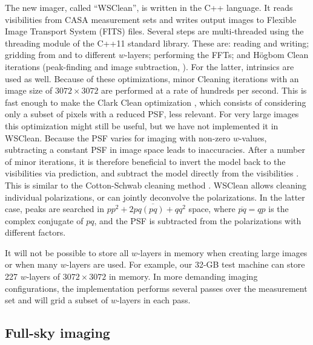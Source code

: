 \documentclass[useAMS,usenatbib]{mn2e}
\begin{document}
The new imager, called ``WSClean'', is written in the C++ language. It reads visibilities from CASA measurement sets and writes output images to Flexible Image Transport System (FITS) files. Several steps are multi-threaded using the threading module of the C++11 standard library. These are: reading and writing; gridding from and to different $w$-layers; performing the FFTs; and H\"ogbom Clean iterations (peak-finding and image subtraction, \citealt{hogbom-clean}). For the latter, intrinsics are used as well. Because of these optimizations, minor Cleaning iterations with an image size of $3072\times3072$ are performed at a rate of hundreds per second. This is fast enough to make the Clark Clean optimization \citep{clark-clean}, which consists of considering only a subset of pixels with a reduced PSF, less relevant. For very large images this optimization might still be useful, but we have not implemented it in WSClean. Because the PSF varies for imaging with non-zero $w$-values, subtracting a constant PSF in image space leads to inaccuracies. After a number of minor iterations, it is therefore beneficial to invert the model back to the visibilities via prediction, and subtract the model directly from the visibilities \citep{wprojection-cornwell}. This is similar to the Cotton-Schwab cleaning method \citep{cotton-schwab-clean}. WSClean allows cleaning individual polarizations, or can jointly deconvolve the polarizations. In the latter case, peaks are searched in $pp^2+2pq \overline{(pq)} + qq^2$ space, where $\overline{pq}=qp$ is the complex conjugate of $pq$, and the PSF is subtracted from the polarizations with different factors.

It will not be possible to store all $w$-layers in memory when creating large images or when many $w$-layers are used. For example, our 32-GB test machine can store 227 $w$-layers of $3072\times3072$ in memory. In more demanding imaging configurations, the implementation performs several passes over the measurement set and will grid a subset of $w$-layers in each pass.

\subsection{Full-sky imaging}
\end{document}
